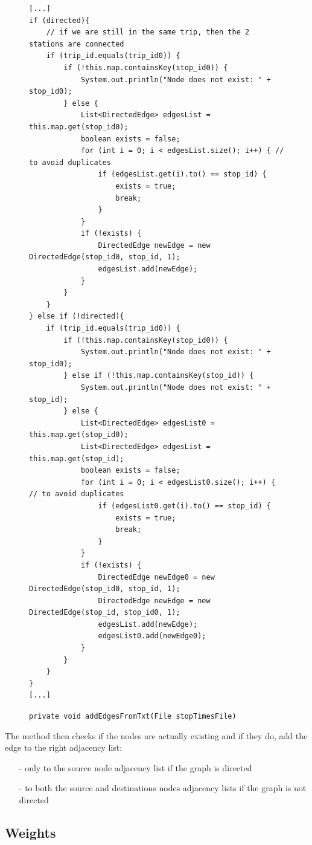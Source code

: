 \documentclass{article}
\begin{document}
\begin{figure}[H]
\begin{verbatim}
[...]
if (directed){
	// if we are still in the same trip, then the 2 stations are connected
	if (trip_id.equals(trip_id0)) { 
		if (!this.map.containsKey(stop_id0)) {
			System.out.println("Node does not exist: " + stop_id0);
		} else {
			List<DirectedEdge> edgesList = this.map.get(stop_id0);
			boolean exists = false;
			for (int i = 0; i < edgesList.size(); i++) { // to avoid duplicates
				if (edgesList.get(i).to() == stop_id) {
					exists = true;
					break;
				}
			}
			if (!exists) {
				DirectedEdge newEdge = new DirectedEdge(stop_id0, stop_id, 1);
				edgesList.add(newEdge);
			}
		}
	}
} else if (!directed){
	if (trip_id.equals(trip_id0)) { 
		if (!this.map.containsKey(stop_id0)) {
			System.out.println("Node does not exist: " + stop_id0);
		} else if (!this.map.containsKey(stop_id)) {
			System.out.println("Node does not exist: " + stop_id);
		} else {	
			List<DirectedEdge> edgesList0 = this.map.get(stop_id0);
			List<DirectedEdge> edgesList = this.map.get(stop_id);
			boolean exists = false;
			for (int i = 0; i < edgesList0.size(); i++) { // to avoid duplicates
				if (edgesList0.get(i).to() == stop_id) {
					exists = true;
					break;
				}
			}
			if (!exists) {
				DirectedEdge newEdge0 = new DirectedEdge(stop_id0, stop_id, 1);
				DirectedEdge newEdge = new DirectedEdge(stop_id, stop_id0, 1);
				edgesList.add(newEdge);
				edgesList0.add(newEdge0);
			}
		}
	}
}
[...]
\end{verbatim}
\vspace*{-10mm}\caption{\texttt{private void addEdgesFromTxt(File stopTimesFile)}}
\end{figure}

The method then checks if the nodes are actually existing and if they do, add the edge to the right adjacency list:

\begin{itemize}
\itemsep0em 
\item[-] only to the source node adjacency list if the graph is directed
\item[-] to both the source and destinations nodes adjacency lists if the graph is not directed
\end{itemize}

\newpage

\subsection{Weights}
\end{document}
